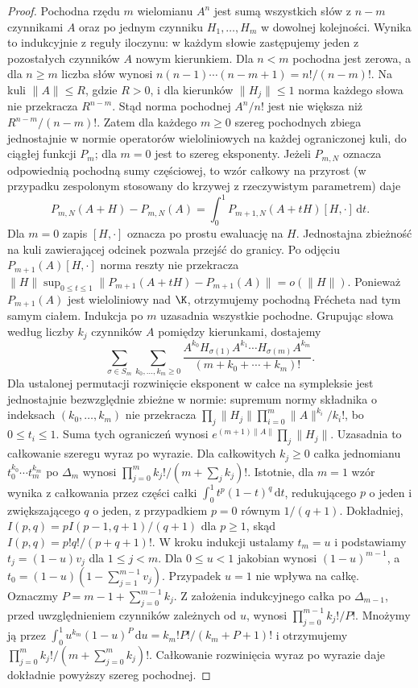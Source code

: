 \begin{proof}
Pochodna rzędu $m$ wielomianu $A^n$ jest sumą wszystkich
słów z $n-m$ czynnikami $A$ oraz po jednym czynniku
$H_1,\ldots,H_m$ w dowolnej kolejności. Wynika to
indukcyjnie z reguły iloczynu: w każdym słowie zastępujemy
jeden z pozostałych czynników $A$ nowym kierunkiem.
Dla $n<m$ pochodna jest zerowa, a dla $n\ge m$ liczba słów wynosi $n(n-1)\cdots(n-m+1)=n!/(n-m)!$. Na kuli $\|A\|\le R$, gdzie $R>0$, i dla kierunków $\|H_j\|\le1$ norma każdego słowa nie przekracza $R^{n-m}$. Stąd norma pochodnej $A^n/n!$ jest nie większa niż $R^{n-m}/(n-m)!$.
Zatem dla każdego $m\ge0$ szereg pochodnych zbiega jednostajnie w normie operatorów wieloliniowych na każdej ograniczonej kuli, do ciągłej funkcji $P_m$; dla $m=0$ jest to szereg eksponenty. Jeżeli $P_{m,N}$ oznacza odpowiednią pochodną sumy częściowej, to wzór całkowy na przyrost (w przypadku zespolonym stosowany do krzywej z rzeczywistym parametrem) daje
\[
 P_{m,N}(A+H)-P_{m,N}(A)=\int_0^1 P_{m+1,N}(A+tH)[H,\cdot]\,\mathrm dt .
\]
Dla $m=0$ zapis $[H,\cdot]$ oznacza po prostu ewaluację na $H$. Jednostajna zbieżność na kuli zawierającej odcinek pozwala przejść do granicy. Po odjęciu $P_{m+1}(A)[H,\cdot]$ norma reszty nie przekracza $\|H\|\sup_{0\le t\le1}\|P_{m+1}(A+tH)-P_{m+1}(A)\|=o(\|H\|)$. Ponieważ $P_{m+1}(A)$ jest wieloliniowy nad $\K$, otrzymujemy pochodną Frécheta nad tym samym ciałem. Indukcja po $m$ uzasadnia wszystkie pochodne.
Grupując słowa według liczby $k_j$ czynników $A$
pomiędzy kierunkami, dostajemy
\[
 \sum_{\sigma\in S_m}\sum_{k_0,\ldots,k_m\ge0}
 \frac{A^{k_0}H_{\sigma(1)}A^{k_1}\cdots H_{\sigma(m)}A^{k_m}}
 {(m+k_0+\cdots+k_m)!}.
\]
Dla ustalonej permutacji rozwinięcie eksponent w całce na sympleksie jest jednostajnie bezwzględnie zbieżne w normie: supremum normy składnika o indeksach $(k_0,\ldots,k_m)$ nie przekracza $\prod_j\|H_j\|\prod_{i=0}^m\|A\|^{k_i}/k_i!$, bo $0\le t_i\le1$. Suma tych ograniczeń wynosi $e^{(m+1)\|A\|}\prod_j\|H_j\|$. Uzasadnia to całkowanie szeregu wyraz po wyrazie.
Dla całkowitych $k_j\ge0$ całka jednomianu
$t_0^{k_0}\cdots t_m^{k_m}$ po $\Delta_m$ wynosi
$\prod_{j=0}^m k_j!/(m+\sum_j k_j)!$.
Istotnie, dla $m=1$ wzór wynika z całkowania przez
części całki $\int_0^1 t^p(1-t)^q\,\mathrm dt$,
redukującego $p$ o jeden i zwiększającego $q$ o jeden,
z przypadkiem $p=0$ równym $1/(q+1)$. Dokładniej,
$I(p,q)=pI(p-1,q+1)/(q+1)$ dla $p\ge1$, skąd
$I(p,q)=p!q!/(p+q+1)!$.
W kroku indukcji ustalamy $t_m=u$ i podstawiamy
$t_j=(1-u)v_j$ dla $1\le j<m$. Dla $0\le u<1$
jakobian wynosi $(1-u)^{m-1}$, a $t_0=(1-u)(1-\sum_{j=1}^{m-1}v_j)$.
Przypadek $u=1$ nie wpływa na całkę. Oznaczmy
$P=m-1+\sum_{j=0}^{m-1}k_j$.
Z założenia indukcyjnego całka po $\Delta_{m-1}$,
przed uwzględnieniem czynników zależnych od $u$,
wynosi $\prod_{j=0}^{m-1}k_j!/P!$.
Mnożymy ją przez $\int_0^1u^{k_m}(1-u)^P\,\mathrm du
=k_m!P!/(k_m+P+1)!$ i otrzymujemy
$\prod_{j=0}^{m}k_j!/(m+\sum_{j=0}^m k_j)!$.
Całkowanie rozwinięcia wyraz po wyrazie daje dokładnie
powyższy szereg pochodnej.
\end{proof}


